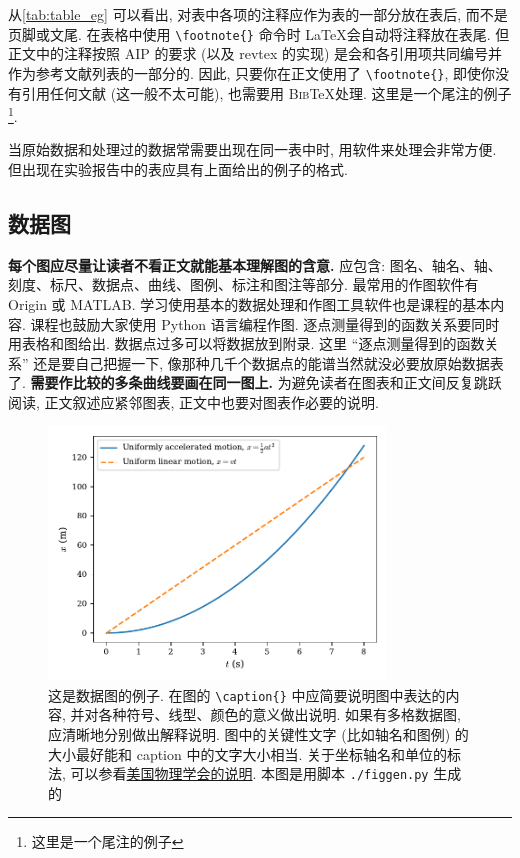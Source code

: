 \documentclass[notofandol]{mpltx}
\newcommand{\note}[1]{{\color{gray}#1}}
\begin{document}
从\autoref{tab:table_eg} 可以看出, 对表中各项的注释应作为表的一部分放在表后, 而不是页脚或文尾.
\note{在表格中使用 \texttt{\textbackslash{}footnote\{\}} 命令时 \LaTeX 会自动将注释放在表尾.
    但正文中的注释按照 AIP 的要求 (以及 \textsf{revtex} 的实现) 是会和各引用项共同编号并作为参考文献列表的一部分的.
    因此, 只要你在正文使用了 \texttt{\textbackslash{}footnote\{\}}, 即使你没有引用任何文献 (这一般不太可能), 也需要用 B\textsc{ib}\TeX 处理.
    这里是一个尾注的例子 \footnote{这里是一个尾注的例子}.}

当原始数据和处理过的数据常需要出现在同一表中时, 用软件来处理会非常方便.
但出现在实验报告中的表应具有上面给出的例子的格式.

\subsection{数据图}

\textbf{每个图应尽量让读者不看正文就能基本理解图的含意.}
应包含: 图名、轴名、轴、刻度、标尺、数据点、曲线、图例、标注和图注等部分.
最常用的作图软件有 Origin 或 MATLAB.
学习使用基本的数据处理和作图工具软件也是课程的基本内容.
课程也鼓励大家使用 Python 语言编程作图.
逐点测量得到的函数关系要同时用表格和图给出.
\note{数据点过多可以将数据放到附录.
    这里 ``逐点测量得到的函数关系'' 还是要自己把握一下, 像那种几千个数据点的能谱当然就没必要放原始数据表了.}
\textbf{需要作比较的多条曲线要画在同一图上.}
为避免读者在图表和正文间反复跳跃阅读, 正文叙述应紧邻图表, 正文中也要对图表作必要的说明.

\begin{figure}
    \centering
    \includegraphics[width=0.8\textwidth]{fig/figsample.pdf}
    \caption{这是数据图的例子.
        \note{在图的 \texttt{\textbackslash{}caption\{\}} 中应简要说明图中表达的内容, 并对各种符号、线型、颜色的意义做出说明.
            如果有多格数据图, 应清晰地分别做出解释说明.
            图中的关键性文字 (比如轴名和图例) 的大小最好能和 caption 中的文字大小相当.
            关于坐标轴名和单位的标法, 可以参看\href{https://journals.aps.org/authors/axis-labels-and-scales-on-graphs-h18}{美国物理学会的说明}.
            本图是用脚本 \texttt{./figgen.py} 生成的}}
    \label{fig:data}
\end{figure}
\end{document}
